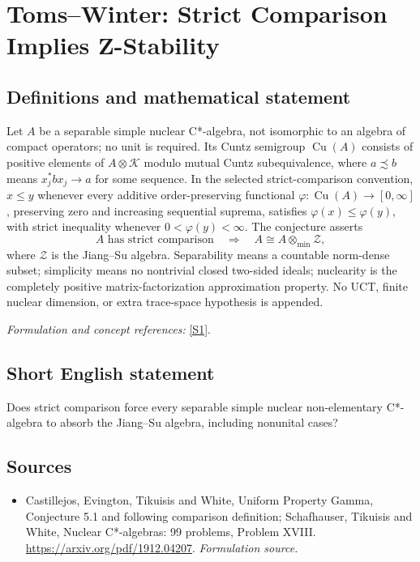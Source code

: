 \documentclass[11pt]{article}
\begin{document}
\section*{\texorpdfstring{Toms–Winter: Strict Comparison Implies Z-Stability}{Toms–Winter: Strict Comparison Implies Z-Stability}}\label{30006895}
\subsection{Definitions and mathematical statement}
Let $A$ be a separable simple nuclear C*-algebra, not isomorphic to an algebra of compact operators; no unit is required. Its Cuntz semigroup $\operatorname{Cu}(A)$ consists of positive elements of $A\otimes\mathcal K$ modulo mutual Cuntz subequivalence, where $a\precsim b$ means $x_j^*bx_j\to a$ for some sequence. In the selected strict-comparison convention, $x\le y$ whenever every additive order-preserving functional $\varphi:\operatorname{Cu}(A)\to[0,\infty]$, preserving zero and increasing sequential suprema, satisfies $\varphi(x)\le\varphi(y)$, with strict inequality whenever $0<\varphi(y)<\infty$. The conjecture asserts
\[
 A\text{ has strict comparison}\quad\Longrightarrow\quad
 A\cong A\otimes_{\min}\mathcal Z,
\]
where $\mathcal Z$ is the Jiang--Su algebra. Separability means a countable norm-dense subset; simplicity means no nontrivial closed two-sided ideals; nuclearity is the completely positive matrix-factorization approximation property. No UCT, finite nuclear dimension, or extra trace-space hypothesis is appended.
\par\smallskip\textit{Formulation and concept references:} \href{https://arxiv.org/pdf/1912.04207}{[S1]}.

\subsection{Short English statement}
Does strict comparison force every separable simple nuclear non-elementary C*-algebra to absorb the Jiang--Su algebra, including nonunital cases?
\subsection{Sources}
\begin{itemize}
\item[S1]Castillejos, Evington, Tikuisis and White, Uniform Property Gamma, Conjecture 5.1 and following comparison definition; Schafhauser, Tikuisis and White, Nuclear C*-algebras: 99 problems, Problem XVIII.
\url{https://arxiv.org/pdf/1912.04207}.
\textit{Formulation source.}
\end{itemize}
\end{document}
